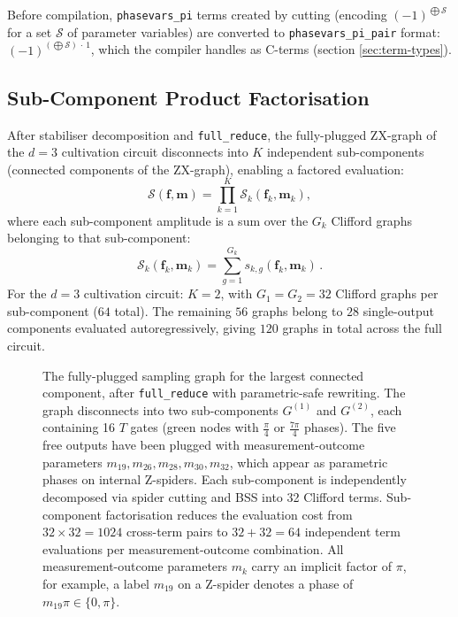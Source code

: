 \documentclass[a4paper,onecolumn,11pt,accepted=2026-06-10]{quantumarticle}
\begin{document}
Before compilation, \texttt{phasevars\_pi} terms created by cutting (encoding $(-1)^{\bigoplus \mathcal{S}}$ for a set $\mathcal{S}$ of parameter variables) are
converted to \texttt{phasevars\_pi\_pair} format: $(-1)^{(\bigoplus \mathcal{S})\,\cdot\, 1}$, which the compiler handles as C-terms (section \ref{sec:term-types}).

\subsection{Sub-Component Product Factorisation}
\label{sec:factorisation}

After stabiliser decomposition and \texttt{full\_reduce}, the fully-plugged ZX-graph of the $d=3$ cultivation circuit disconnects into $K$ independent sub-components (connected components of the ZX-graph), enabling a factored evaluation:
\begin{equation}
\label{eq:factored}
    \mathcal{S}(\mathbf{f}, \mathbf{m})
    = \prod_{k=1}^{K} \mathcal{S}_k(\mathbf{f}_k, \mathbf{m}_k),
\end{equation}
where each sub-component amplitude is a sum over the $G_k$ Clifford graphs belonging to that sub-component:
\begin{equation}
    \mathcal{S}_k(\mathbf{f}_k, \mathbf{m}_k)
    = \sum_{g=1}^{G_k} s_{k,g}(\mathbf{f}_k, \mathbf{m}_k)\,.
\end{equation}
For the $d=3$ cultivation circuit: $K = 2$, with $G_1 = G_2 = 32$ Clifford graphs per sub-component ($64$ total). The remaining $56$ graphs belong to $28$ single-output components evaluated autoregressively, giving $120$ graphs in total across the full circuit.
\begin{figure}
    \centering
    \caption{The fully-plugged sampling graph for the largest connected component, after \texttt{full\_reduce} with parametric-safe rewriting. The graph disconnects into two sub-components $G^{(1)}$ and $G^{(2)}$, each containing 16 $T$ gates (green nodes with $\frac{\pi}{4}$ or $\frac{7\pi}{4}$ phases). The five free outputs have been plugged with measurement-outcome parameters $m_{19}, m_{26}, m_{28}, m_{30}, m_{32}$, which appear as parametric phases on internal Z-spiders. Each sub-component is independently decomposed via spider cutting and BSS into 32 Clifford terms. Sub-component factorisation reduces the evaluation cost from $32 \times 32 = 1024$ cross-term pairs to $32 + 32 = 64$ independent term evaluations per measurement-outcome combination. All measurement-outcome parameters $m_k$ carry an implicit factor of $\pi$, for example, a label $m_{19}$ on a Z-spider denotes a phase of $m_{19}\pi \in \{0, \pi\}$.
}
    \label{fig:zx-diagram}
\end{figure}
\end{document}
